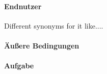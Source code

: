 \paragraph{Endnutzer}

Different synonyms for it like....

\paragraph{Äußere Bedingungen}

\paragraph{Aufgabe}